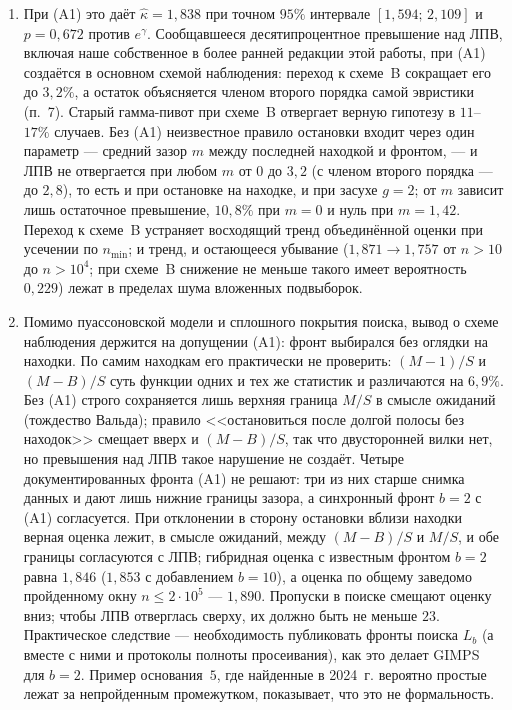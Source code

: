 \documentclass[11pt,a4paper]{article}
\theoremstyle{plain}
\theoremstyle{remark}
\newcommand{\eg}{e^{\gamma}}
\begin{document}
\begin{enumerate}
\item При (A1) это даёт $\hat\kappa=1{,}838$ при точном $95\%$ интервале
$[1{,}594;\,2{,}109]$ и $p=0{,}672$ против $\eg$. Сообщавшееся десятипроцентное
превышение над ЛПВ, включая наше собственное в более ранней редакции этой работы,
при (A1) создаётся в основном схемой наблюдения: переход к схеме~B сокращает его до
$3{,}2\%$, а остаток объясняется членом второго порядка самой эвристики (п.~7).
Старый гамма-пивот при схеме~B отвергает верную гипотезу в $11$--$17\%$ случаев.
Без (A1) неизвестное правило остановки входит через один параметр --- средний
зазор $m$ между последней находкой и фронтом, --- и ЛПВ не отвергается при любом $m$
от $0$ до $3{,}2$ (с членом второго порядка --- до $2{,}8$), то есть и при остановке
на находке, и при засухе $g=2$; от $m$ зависит лишь остаточное
превышение, $10{,}8\%$ при $m=0$ и нуль при $m=1{,}42$. Переход к схеме~B устраняет
восходящий тренд объединённой оценки при усечении по $n_{\min}$; и тренд, и
остающееся убывание ($1{,}871\to1{,}757$ от $n>10$ до $n>10^4$; при схеме~B снижение не меньше такого имеет вероятность $0{,}229$) лежат
в пределах шума вложенных подвыборок.

\item Помимо пуассоновской модели и сплошного покрытия поиска, вывод о схеме
наблюдения держится на допущении (A1): фронт выбирался без оглядки на находки. По
самим находкам его практически не проверить: $(M-1)/S$ и $(M-B)/S$ суть функции
одних и тех же статистик и различаются на $6{,}9\%$. Без (A1) строго сохраняется лишь верхняя
граница $M/S$ в смысле ожиданий (тождество Вальда); правило <<остановиться после
долгой полосы без находок>> смещает вверх и $(M-B)/S$, так что двусторонней вилки
нет, но превышения над ЛПВ такое нарушение не создаёт. Четыре документированных фронта
(A1) не решают: три из них старше снимка данных и дают лишь нижние границы зазора,
а синхронный фронт $b=2$ с (A1) согласуется. При отклонении в сторону остановки
вблизи находки верная оценка лежит, в смысле ожиданий, между $(M-B)/S$ и $M/S$, и
обе границы согласуются с ЛПВ; гибридная оценка с известным фронтом $b=2$ равна
$1{,}846$ ($1{,}853$ с добавлением $b=10$), а оценка по общему заведомо пройденному окну
$n\le2\cdot10^5$ --- $1{,}890$. Пропуски в поиске смещают оценку вниз; чтобы ЛПВ
отверглась сверху, их должно быть не меньше $23$. Практическое следствие --- необходимость публиковать фронты поиска $L_b$
(а вместе с ними и протоколы полноты просеивания), как это делает GIMPS для $b=2$.
Пример основания~$5$, где найденные в 2024~г. вероятно простые лежат за
непройденным промежутком, показывает, что это не формальность.


\end{enumerate}
\end{document}
